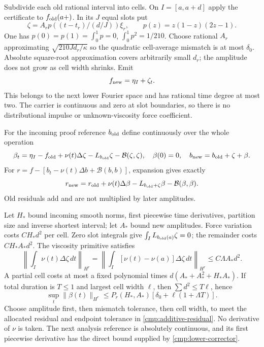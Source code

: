 \documentclass[11pt,a4paper]{amsart}
\theoremstyle{definition}
\theoremstyle{remark}
\numberwithin{equation}{section}
\newcommand{\Bcal}{\mathcal B}
\begin{document}
Subdivide each old rational interval into cells. On $I=[a,a+d]$ apply the
certificate to $f_{\rm old}(a+)$. In its $J$ equal slots put
\[
 \zeta=A_r p((t-t_r)/(d/J))\xi_r,\qquad p(z)=z(1-z)(2z-1).
\]
One has $p(0)=p(1)=\int_0^1p=0$, $\int_0^1p^2=1/210$.
Choose rational $A_r$ approximating $\sqrt{210Jd_r/\kappa}$ so the
quadratic cell-average mismatch is at most $\delta_0$. Absolute square-root
approximation covers arbitrarily small $d_r$; the amplitude does not grow
as cell width shrinks. Emit
\begin{equation}
 f_{\rm new}=\eta_I+\zeta_t.\label{cmp:emitted-lower}
\end{equation}
This belongs to the next lower Fourier space and has rational time degree
at most two. The carrier is continuous and zero at slot boundaries, so
there is no distributional impulse or unknown-viscosity force coefficient.

For the incoming proof reference $b_{\rm old}$ define continuously over the
whole operation
\begin{equation}
 \beta_t=\eta_I-f_{\rm old}+\nu(t)\Delta\zeta
                -L_{b_{\rm old}}\zeta-\Bcal(\zeta,\zeta),\quad
 \beta(0)=0,\quad b_{\rm new}=b_{\rm old}+\zeta+\beta.
 \label{cmp:lower-corrector}
\end{equation}
For $r=f-[b_t-\nu(t)\Delta b+\Bcal(b,b)]$, expansion gives exactly
\begin{equation}
 r_{\rm new}=r_{\rm old}+\nu(t)\Delta\beta
                -L_{b_{\rm old}+\zeta}\beta-\Bcal(\beta,\beta).
 \label{cmp:additive-residual}
\end{equation}
Old residuals add and are not multiplied by later amplitudes.

Let $H_*$ bound incoming smooth norms, first piecewise time derivatives,
partition size and inverse shortest interval; let $A_*$ bound new amplitudes.
Force variation costs $CH_*d^2$ per cell. Zero slot integrals give
$\int_I L_{b_{\rm old}(a)}\zeta=0$; the remainder costs $CH_*A_*d^2$.
The viscosity primitive satisfies
\[
 \left\|\int_I\nu(t)\Delta\zeta\,dt\right\|_{H^r}
 =\left\|\int_I[\nu(t)-\nu(a)]\Delta\zeta\,dt\right\|_{H^r}
 \le C\Lambda A_*d^2.
\]
A partial cell costs at most a fixed polynomial times
$d(A_*+A_*^2+H_*A_*)$. If total duration is $T\le1$ and largest cell
width $\ell$, then $\sum d^2\le T\ell$, hence
\begin{equation}
 \sup_t\|\beta(t)\|_{H^r}
 \le P_r(H_*,A_*)[\delta_0+\ell(1+\Lambda T)].
 \label{cmp:primitive-bound}
\end{equation}
Choose amplitude first, then mismatch tolerance, then cell width, to meet
the allocated residual and endpoint tolerance in
\eqref{cmp:additive-residual}. No derivative of $\nu$ is taken. The next
analysis reference is absolutely continuous, and its first piecewise
derivative has the direct bound supplied by \eqref{cmp:lower-corrector}.
\end{document}
